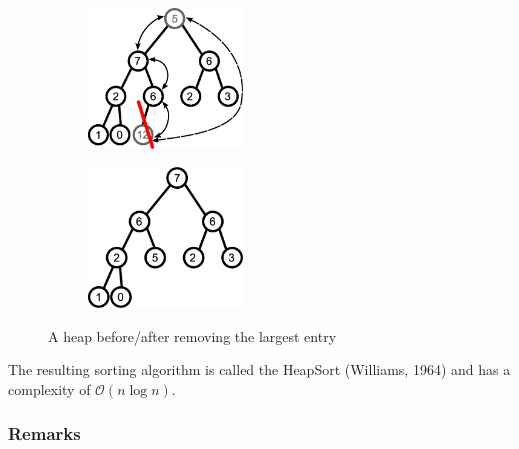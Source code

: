 \documentclass[11pt,a4paper]{article}
\begin{document}
\begin{figure}[htbp]
\centering
\begin{subfigure}
\centering
\includegraphics[width=0.45\textwidth]{inkscape/tree4.eps}
\end{subfigure}%
\begin{subfigure}
\centering
\includegraphics[width=0.45\textwidth]{inkscape/tree5.eps}
\end{subfigure}%
\caption{A heap before/after removing the largest entry}
\label{tree4-5}
\end{figure}
The resulting sorting algorithm is called the HeapSort (Williams, 1964) and has a complexity of $\mathcal{O}(n\log n)$.

\subsubsection*{Remarks}
\end{document}
